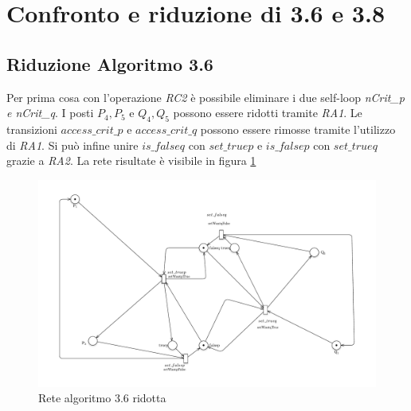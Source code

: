 \documentclass[a4paper]{article}
\begin{document}
\section{Confronto e riduzione di 3.6 e 3.8}

\subsection{Riduzione Algoritmo 3.6}
Per prima cosa con l'operazione \textit{RC2} è possibile eliminare i due self-loop \textit{nCrit\_p \textit{e} nCrit\_q}.
I posti $P_4,P_5$ e $Q_4,Q_5$ possono essere ridotti tramite \textit{RA1}.
Le transizioni $access\_crit\_p$ e $access\_crit\_q$ possono essere rimosse tramite l'utilizzo di \textit{RA1}.
Si può infine unire $is\_falseq$ con $set\_truep$ e $is\_falsep$ con $set\_trueq$ grazie a \textit{RA2}.
La rete risultate è visibile in figura \ref{FIG:3.6Red}
\begin{figure}[!ht]
\centering
\includegraphics[width=1\textwidth]{3.6Red}
\caption{Rete algoritmo 3.6 ridotta} \label{FIG:3.6Red}
\end{figure}
\end{document}
